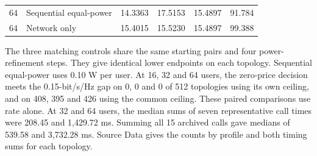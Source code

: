 \documentclass[10pt,letterpaper]{article}
\begin{document}
\begin{table}[htbp]
\begin{tabular}{llllll}
64 & Sequential equal-power & 14.3363 & 17.5153 & 15.4897 & 91.784\\
64 & Network only & 15.4015 & 15.5230 & 15.4897 & 99.388\\
\bottomrule\end{tabular}
\par\medskip\begin{minipage}{\linewidth}\small
The three matching controls share the same starting pairs and four power-refinement steps. They give identical lower endpoints on each topology. Sequential equal-power uses 0.10 W per user. At 16, 32 and 64 users, the zero-price decision meets the 0.15-bit/s/Hz gap on 0, 0 and 0 of 512 topologies using its own ceiling, and on 408, 395 and 426 using the common ceiling. These paired comparisons use rate alone. At 32 and 64 users, the median sums of seven representative call times were 208.45 and 1,429.72 ms. Summing all 15 archived calls gave medians of 539.58 and 3,732.28 ms. Source Data gives the counts by profile and both timing sums for each topology.
\end{minipage}
\end{table}
\end{document}
